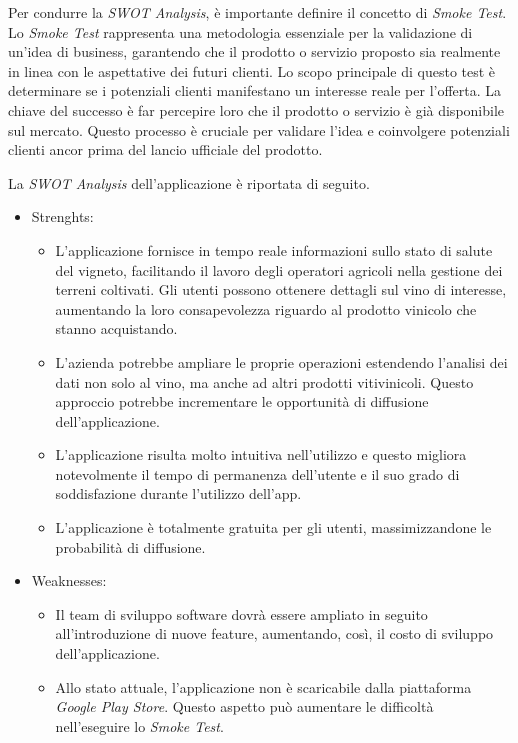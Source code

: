 Per condurre la \textit{SWOT Analysis}, è importante definire il concetto di \textit{Smoke Test}. Lo \textit{Smoke Test} rappresenta una metodologia essenziale per la validazione di un'idea di business, garantendo che il prodotto o servizio proposto sia realmente in linea con le aspettative dei futuri clienti. Lo scopo principale di questo test è determinare se i potenziali clienti manifestano un interesse reale per l'offerta. La chiave del successo è far percepire loro che il prodotto o servizio è già disponibile sul mercato. Questo processo è cruciale per validare l'idea e coinvolgere potenziali clienti ancor prima del lancio ufficiale del prodotto.

La \textit{SWOT Analysis} dell'applicazione è riportata di seguito.

\begin{itemize}
	\item Strenghts:
	\begin{itemize}
		\item L'applicazione fornisce in tempo reale informazioni sullo stato di salute del vigneto, facilitando il lavoro degli operatori agricoli nella gestione dei terreni coltivati. Gli utenti possono ottenere dettagli sul vino di interesse, aumentando la loro consapevolezza riguardo al prodotto vinicolo che stanno acquistando.
		\item L'azienda potrebbe ampliare le proprie operazioni estendendo l'analisi dei dati non solo al vino, ma anche ad altri prodotti vitivinicoli. Questo approccio potrebbe incrementare le opportunità di diffusione dell'applicazione.
		\item L'applicazione risulta molto intuitiva nell'utilizzo e questo migliora notevolmente il tempo di permanenza dell'utente e il suo grado di soddisfazione durante l'utilizzo dell'app.
		\item L'applicazione è totalmente gratuita per gli utenti, massimizzandone le probabilità di diffusione.	
	\end{itemize}
	\item Weaknesses:
	\begin{itemize}
		\item Il team di sviluppo software dovrà essere ampliato in seguito all'introduzione di nuove feature, aumentando, così, il costo di sviluppo dell'applicazione.
		\item Allo stato attuale, l'applicazione non è scaricabile dalla piattaforma \textit{Google Play Store}. Questo aspetto può aumentare le difficoltà nell'eseguire lo \textit{Smoke Test}.

\end{itemize}
\end{itemize}
